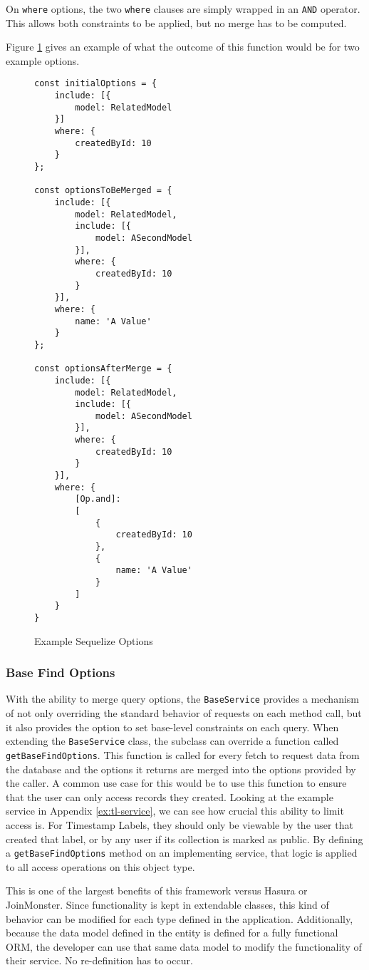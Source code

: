 On \verb!where! options, the two \verb!where! clauses are simply wrapped in an \verb!AND! operator.  This allows both constraints to be applied, but no merge has to be computed.

Figure \ref{fig:merge-options} gives an example of what the outcome of this function would be for two example options.

\begin{figure}
    \begin{Verbatim}[fontsize=\footnotesize]
const initialOptions = {
    include: [{
        model: RelatedModel
    }]
    where: {
        createdById: 10
    }
};

const optionsToBeMerged = {
    include: [{
        model: RelatedModel,
        include: [{
            model: ASecondModel
        }],
        where: {
            createdById: 10
        }
    }],
    where: {
        name: 'A Value'
    }
};

const optionsAfterMerge = {
    include: [{
        model: RelatedModel,
        include: [{
            model: ASecondModel
        }],
        where: {
            createdById: 10
        }
    }],
    where: {
        [Op.and]: 
        [
            {
                createdById: 10
            },
            {
                name: 'A Value'
            }
        ]
    }
}
    \end{Verbatim}
    \caption{Example Sequelize Options}
    \label{fig:merge-options}
\end{figure}

\subsubsection{Base Find Options}
With the ability to merge query options, the \verb!BaseService! provides a mechanism of not only overriding the standard behavior of requests on each method call, but it also provides the option to set base-level constraints on each query.  When extending the \verb!BaseService! class, the subclass can override a function called \verb!getBaseFindOptions!.  This function is called for every fetch to request data from the database and the options it returns are merged into the options provided by the caller.  A common use case for this would be to use this function to ensure that the user can only access records they created.  Looking at the example service in Appendix \ref{ex:tl-service}, we can see how crucial this ability to limit access is.  For Timestamp Labels, they should only be viewable by the user that created that label, or by any user if its collection is marked as public.  By defining a \verb!getBaseFindOptions! method on an implementing service, that logic is applied to all access operations on this object type.  

This is one of the largest benefits of this framework versus Hasura or JoinMonster.  Since functionality is kept in extendable classes, this kind of behavior can be modified for each type defined in the application. Additionally, because the data model defined in the entity is defined for a fully functional ORM, the developer can use that same data model to modify the functionality of their service. No re-definition has to occur.